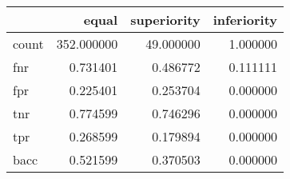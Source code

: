 \begin{tabular}{lrrr}
\toprule
{} &       equal &  superiority &  inferiority \\
\midrule
count &  352.000000 &    49.000000 &     1.000000 \\
fnr   &    0.731401 &     0.486772 &     0.111111 \\
fpr   &    0.225401 &     0.253704 &     0.000000 \\
tnr   &    0.774599 &     0.746296 &     0.000000 \\
tpr   &    0.268599 &     0.179894 &     0.000000 \\
bacc  &    0.521599 &     0.370503 &     0.000000 \\
\bottomrule
\end{tabular}
